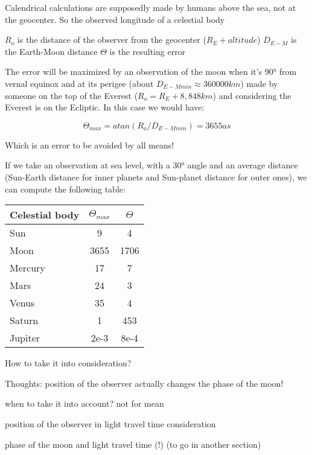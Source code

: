 
Calendrical calculations are supposedly made by humans above the sea, not at the geocenter. So the observed longitude of a celestial body 

$R_o$ is the distance of the observer from the geocenter ($R_E+altitude$)
$D_{E-M}$ is the Earth-Moon distance
$\Theta$ is the resulting error

The error will be maximized by an observation of the moon when it's $90°$ from vernal equinox and at its perigee (about $D_{E-Mmin}\approx360000km$) made by someone on the top of the Everest ($R_o=R_E+8,848km$) and considering the Everest is on the Ecliptic. In this case we would have:

$$\Theta_{max} = atan(R_o/D_{E-Mmin}) = 3655as$$


Which is an error to be avoided by all means!

If we take an observation at sea level, with a $30°$ angle and an average distance (Sun-Earth distance for inner planets and Sun-planet distance for outer ones), we can compute the following table:

\begin{center}
\begin{tabular}{|l|S|S|}
\hline
\textbf{Celestial body} &  &   \\\hline
Sun & 9 & 4\\\hline %
Moon & 3655 & 1706\\\hline %
Mercury & 17 & 7\\\hline %
Mars & 24 & 3\\\hline %
Venus & 35 & 4\\\hline %
Saturn & 1 & 453\\\hline %
Jupiter & 2e-3 & 8e-4 \\\hline %
\end{tabular}
\end{center}

How to take it into consideration?

Thoughts: position of the observer actually changes the phase of the moon!

when to take it into account? not for mean

position of the observer in light travel time consideration

phase of the moon and light travel time (!) (to go in another section)
